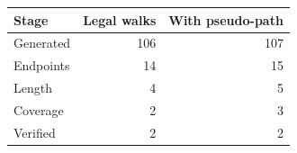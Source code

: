 \begin{tabular}{lrr}
\toprule Stage & Legal walks & With pseudo-path \\
\midrule
Generated & 106 & 107 \\
Endpoints & 14 & 15 \\
Length & 4 & 5 \\
Coverage & 2 & 3 \\
Verified & 2 & 2 \\
\bottomrule
\end{tabular}
